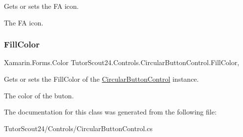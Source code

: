 Gets or sets the FA icon. 

The FA icon.\mbox{\label{class_tutor_scout24_1_1_controls_1_1_circular_button_control_a0c757d1aaf6e3e6f1fa65a223ea4e7fa}} 
\subsubsection{\texorpdfstring{Fill\+Color}{FillColor}}
{\footnotesize\ttfamily Xamarin.\+Forms.\+Color Tutor\+Scout24.\+Controls.\+Circular\+Button\+Control.\+Fill\+Color\hspace{0.3cm}{\ttfamily [get]}, {\ttfamily [set]}}



Gets or sets the Fill\+Color of the \mbox{\hyperlink{class_tutor_scout24_1_1_controls_1_1_circular_button_control}{Circular\+Button\+Control}} instance. 

The color of the buton.

The documentation for this class was generated from the following file\+:\begin{DoxyCompactItemize}
\item 
Tutor\+Scout24/\+Controls/Circular\+Button\+Control.\+cs\end{DoxyCompactItemize}
